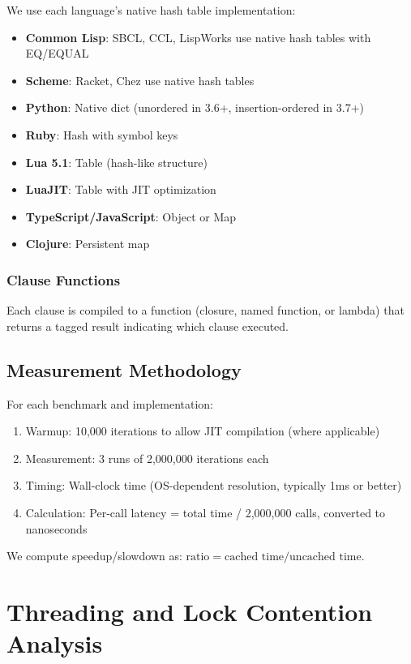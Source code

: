 \documentclass[sigplan,final]{acmart}
\begin{document}
We use each language's native hash table implementation:
\begin{itemize}
  \item \textbf{Common Lisp}: SBCL, CCL, LispWorks use native hash tables with EQ/EQUAL
  \item \textbf{Scheme}: Racket, Chez use native hash tables
  \item \textbf{Python}: Native dict (unordered in 3.6+, insertion-ordered in 3.7+)
  \item \textbf{Ruby}: Hash with symbol keys
  \item \textbf{Lua 5.1}: Table (hash-like structure)
  \item \textbf{LuaJIT}: Table with JIT optimization
  \item \textbf{TypeScript/JavaScript}: Object or Map
  \item \textbf{Clojure}: Persistent map
\end{itemize}

\subsubsection{Clause Functions}

Each clause is compiled to a function (closure, named function, or lambda) that returns a
tagged result indicating which clause executed.

\subsection{Measurement Methodology}

For each benchmark and implementation:
\begin{enumerate}
  \item Warmup: 10,000 iterations to allow JIT compilation (where applicable)
  \item Measurement: 3 runs of 2,000,000 iterations each
  \item Timing: Wall-clock time (OS-dependent resolution, typically 1ms or better)
  \item Calculation: Per-call latency = total time / 2,000,000 calls, converted to nanoseconds
\end{enumerate}

We compute speedup/slowdown as: $\text{ratio} = \text{cached time} / \text{uncached time}$.

\section{Threading and Lock Contention Analysis}
\label{sec:threading}
\end{document}
